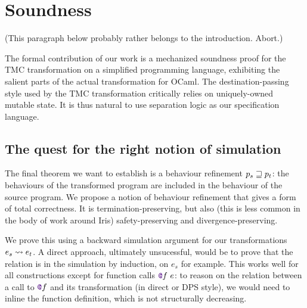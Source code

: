 \section{Soundness}
\label{sec:soundness}

(This paragraph below probably rather belongs to the introduction. Abort.)

The formal contribution of our work is a mechanized soundness proof for the TMC transformation on a simplified programming language, exhibiting the salient parts of the actual transformation for OCaml.
%
The destination-passing style used by the TMC transformation critically relies on uniquely-owned mutable state.
%
It is thus natural to use separation logic as our specification language.

\subsection{The quest for the right notion of simulation}
\label{sec:howto-relation}

The final theorem we want to establish is a behaviour refinement $p_s \sqsupseteq p_t$: the behaviours of the transformed program are included in the behaviour of the source program.
%
We propose a notion of behaviour refinement that gives a form of total correctness.
%
It is termination-preserving, but also (this is less common in the body of work around Iris) safety-preserving and divergence-preserving.

We prove this using a backward simulation argument for our transformations $e_s \rightsquigarrow e_t$.
%
A direct approach, ultimately unsucessful, would be to prove that the relation is in the simulation by induction, on $e_s$ for example.
%
This works well for all constructions except for function calls $\lambdCall{\lambdFunc{f}}{e}$: to reason on the relation between a call to $\lambdFunc{f}$ and its transformation (in direct or DPS style), we would need to inline the function definition, which is not structurally decreasing.

